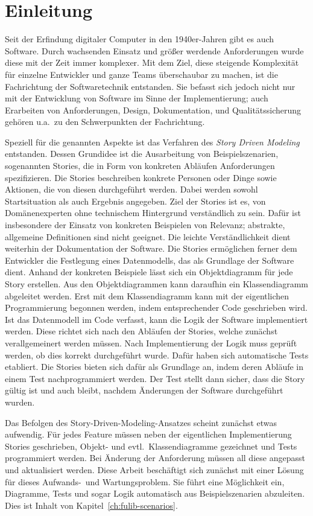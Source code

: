 \chapter{Einleitung}\label{ch:introduction}

Seit der Erfindung digitaler Computer in den 1940er-Jahren gibt es auch Software.
Durch wachsenden Einsatz und größer werdende Anforderungen wurde diese mit der Zeit immer komplexer.
Mit dem Ziel, diese steigende Komplexität für einzelne Entwickler und ganze Teams überschaubar zu machen, ist die Fachrichtung der Softwaretechnik entstanden.
Sie befasst sich jedoch nicht nur mit der Entwicklung von Software im Sinne der Implementierung;
auch Erarbeiten von Anforderungen, Design, Dokumentation, und Qualitätssicherung gehören u.a.\ zu den Schwerpunkten der Fachrichtung.

Speziell für die genannten Aspekte ist das Verfahren des \emph{Story Driven Modeling}~\cite{sdm} entstanden.
Dessen Grundidee ist die Ausarbeitung von Beispielszenarien, sogenannten Stories, die in Form von konkreten Abläufen Anforderungen spezifizieren.
Die Stories beschreiben konkrete Personen oder Dinge sowie Aktionen, die von diesen durchgeführt werden.
Dabei werden sowohl Startsituation als auch Ergebnis angegeben.
Ziel der Stories ist es, von Domänenexperten ohne technischem Hintergrund verständlich zu sein.
Dafür ist insbesondere der Einsatz von konkreten Beispielen von Relevanz;
abstrakte, allgemeine Definitionen sind nicht geeignet.
Die leichte Verständlichkeit dient weiterhin der Dokumentation der Software.
Die Stories ermöglichen ferner dem Entwickler die Festlegung eines Datenmodells, das als Grundlage der Software dient.
Anhand der konkreten Beispiele lässt sich ein Objektdiagramm für jede Story erstellen.
Aus den Objektdiagrammen kann daraufhin ein Klassendiagramm abgeleitet werden.
Erst mit dem Klassendiagramm kann mit der eigentlichen Programmierung begonnen werden, indem entsprechender Code geschrieben wird.
Ist das Datenmodell im Code verfasst, kann die Logik der Software implementiert werden.
Diese richtet sich nach den Abläufen der Stories, welche zunächst verallgemeinert werden müssen.
Nach Implementierung der Logik muss geprüft werden, ob dies korrekt durchgeführt wurde.
Dafür haben sich automatische Tests etabliert.
Die Stories bieten sich dafür als Grundlage an, indem deren Abläufe in einem Test nachprogrammiert werden.
Der Test stellt dann sicher, dass die Story gültig ist und auch bleibt, nachdem Änderungen der Software durchgeführt wurden.

Das Befolgen des Story-Driven-Modeling-Ansatzes scheint zunächst etwas aufwendig.
Für jedes Feature müssen neben der eigentlichen Implementierung Stories geschrieben, Objekt- und evtl.\ Klassendiagramme gezeichnet und Tests programmiert werden.
Bei Änderung der Anforderung müssen all diese angepasst und aktualisiert werden.
Diese Arbeit beschäftigt sich zunächst mit einer Lösung für dieses Aufwands-\ und Wartungsproblem.
Sie führt eine Möglichkeit ein, Diagramme, Tests und sogar Logik automatisch aus Beispielszenarien abzuleiten.
Dies ist Inhalt von Kapitel~\ref{ch:fulib-scenarios}.

